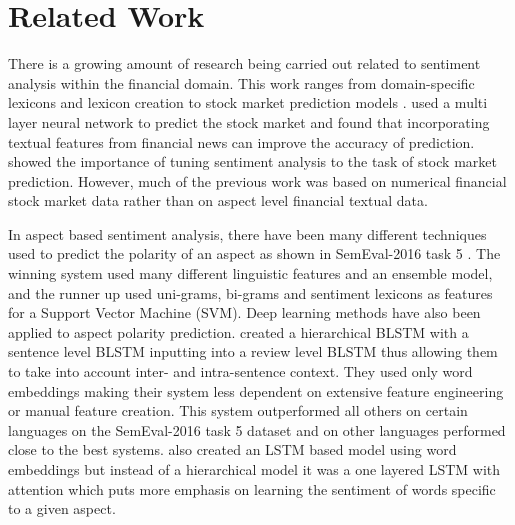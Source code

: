 \documentclass[11pt,a4paper]{article}
\begin{document}


\section{Related Work}
\label{sec:related work}
There is a growing amount of research being carried out related to sentiment analysis within the financial domain. This work ranges from domain-specific lexicons \cite{loughran2011liability} and lexicon creation \cite{moore2016domain} to stock market prediction models \cite{peng2016leverage,kazemian1evaluating}. \citet{peng2016leverage} used a multi layer neural network to predict the stock market and found that incorporating textual features from financial news can improve the accuracy of prediction. \citet{kazemian1evaluating} showed the importance of tuning sentiment analysis to the task of stock market prediction. 
However, much of the previous work was based on numerical financial stock market data rather than on aspect level financial textual data. %

In aspect based sentiment analysis, there have been many different techniques used to predict the polarity of an aspect as shown in SemEval-2016 task 5 \cite{pontiki2014semeval}. The winning system \cite{brun2016xrce} used many different linguistic features and an ensemble model, and the runner up \cite{kumar2016iit} used uni-grams, bi-grams and sentiment lexicons as features for a Support Vector Machine (SVM). Deep learning methods have also been applied to aspect polarity prediction. \citet{ruder2016hierarchical} created a hierarchical BLSTM with a sentence level BLSTM inputting into a review level BLSTM thus allowing them to take into account inter- and intra-sentence context. They used only word embeddings making their system less dependent on extensive feature engineering or manual feature creation. This system outperformed all others on certain languages on the SemEval-2016 task 5 dataset \cite{pontiki2014semeval} and on other languages performed close to the best systems. \citet{wangattention} also created an LSTM based model using word embeddings but instead of a hierarchical model it was a one layered LSTM with attention which puts more emphasis on learning the sentiment of words specific to a given aspect. 
\end{document}
